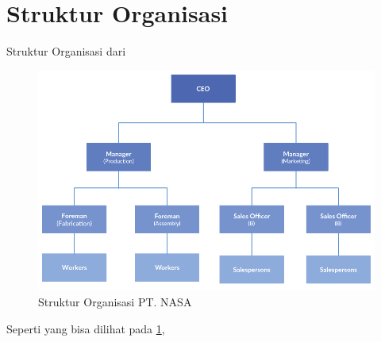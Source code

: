 \section{Struktur Organisasi}
\vspace{1ex}

Struktur Organisasi dari \lipsum[1]
\vspace{0.5ex}

\begin{figure} [ht] \centering
	\includegraphics[scale=0.45]{gambar/struktur-organisasi.png}
	\caption{Struktur Organisasi PT. NASA}
	\label{fig:strukturOrganisasi}
\end{figure}

Seperti yang bisa dilihat pada \ref{fig:strukturOrganisasi}, \lipsum[1]
\vspace{0.5ex}
